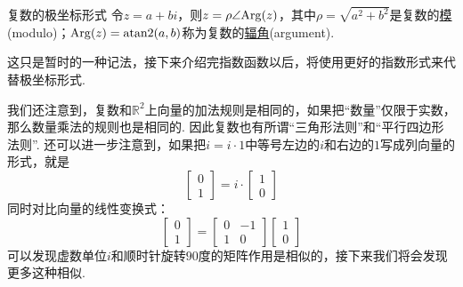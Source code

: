 \begin{definition}{复数的极坐标形式}
    令\(z=a+bi\)，则\(z=\rho\angle{\rm Arg}(z)\)，其中\(\rho=\sqrt{a^2+b^2}\)是复数的\underline{模}(modulo)；\({\rm Arg}(z) = {\rm atan2}(a,b)\)称为复数的\underline{辐角}(argument).
\end{definition}
这只是暂时的一种记法，接下来介绍完指数函数以后，将使用更好的指数形式来代替极坐标形式.

我们还注意到，复数和\(\mathbb{R}^2\)上向量的加法规则是相同的，如果把“数量”仅限于实数，那么数量乘法的规则也是相同的. 因此复数也有所谓“三角形法则”和“平行四边形法则”. 还可以进一步注意到，如果把\(i=i \cdot 1\)中等号左边的\(i\)和右边的\(1\)写成列向量的形式，就是
\[\begin{bmatrix} 0 \\ 1 \end{bmatrix} = i \cdot \begin{bmatrix} 1 \\ 0 \end{bmatrix}\]
同时对比向量的线性变换式：
\[\begin{bmatrix} 0 \\ 1 \end{bmatrix} =  \begin{bmatrix} 0 & -1 \\1 & 0 \end{bmatrix} \begin{bmatrix} 1 \\ 0 \end{bmatrix}\]
可以发现虚数单位\(i\)和顺时针旋转\(90\)度的矩阵作用是相似的，接下来我们将会发现更多这种相似.

